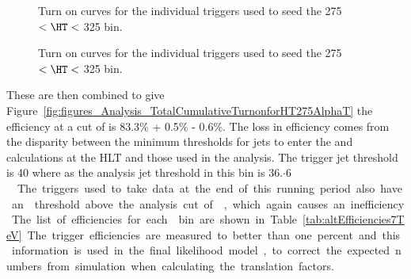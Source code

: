 \begin{figure}[ht]
  \centering
{}
  


\caption{Turn on curves for the individual \alt triggers used to seed the 
\unit{275}{\GeV} $< \HT <$ \unit{325}{\GeV} bin.}
\label{fig:HT275BinTriggers2}
\end{figure}

\begin{figure}[ht]
  \centering
{}
\caption{Turn on curves for the individual \alt triggers used to seed the 
\unit{275}{\GeV} $< \HT <$ \unit{325}{\GeV} bin.}
\label{fig:HT275BinTriggers3}
\end{figure}

These are then combined to give 
Figure~\ref{fig:figures_Analysis_TotalCumulativeTurnonforHT275AlphaT} the 
efficiency at a cut of \altg is 83.3$\%$ + 0.5$\%$ - 0.6$\%$. The loss 
in efficiency comes from the disparity between the minimum thresholds for jets 
to enter the \HT and \alt calculations at the HLT and those used in the 
analysis. The trigger jet \ET threshold is \unit{40}{\GeV} where as 
the analysis jet \ET threshold in this bin is 
\unit{36.$\cdot {6}$}{\GeV}. The triggers used to take data at the end of this 
running period also have an \alt threshold above the analysis cut of \altg, which again causes an inefficiency. The list of efficiencies for each \HT 
bin are shown in Table~\ref{tab:altEfficiencies7TeV}. The trigger efficiencies 
are measured to better than one percent and this information is used in the 
final likelihood model, to correct the expected numbers from simulation when 
calculating the translation factors.


